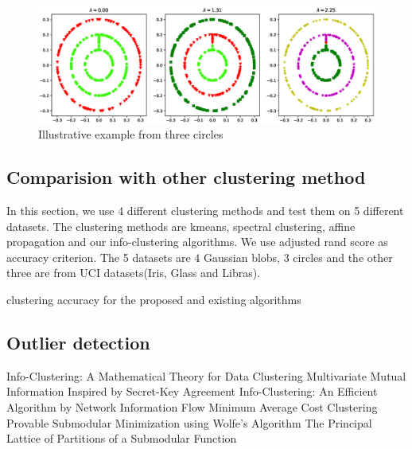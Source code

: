 \documentclass{article}
\begin{document}
\begin{figure}[!ht]
\includegraphics[width=12cm]{pic/3circle.eps}
\caption{Illustrative example from three circles}\label{fig:3c}
\end{figure}
\subsection{Comparision with other clustering method}
In this section, we use 4 different clustering methods and test them on 5 different datasets. The clustering methods are kmeans, spectral clustering, affine propagation and our info-clustering algorithms. We use adjusted rand score as accuracy criterion. The 5 datasets are 4 Gaussian blobs, 3 circles and the other three are from UCI datasets(Iris, Glass and Libras).
\begin{table}[!ht]
\centering
{}
\caption{clustering accuracy for the proposed and existing algorithms}
\end{table}
\subsection{Outlier detection}
\begin{thebibliography}{9}
Info-Clustering: A Mathematical Theory for Data Clustering
 Multivariate Mutual Information Inspired by Secret-Key Agreement
 Info-Clustering: An Efficient Algorithm by Network Information Flow
 Minimum Average Cost Clustering
 Provable Submodular Minimization using Wolfe's Algorithm
 The Principal Lattice of Partitions of a Submodular Function
\end{thebibliography}
\end{document}
